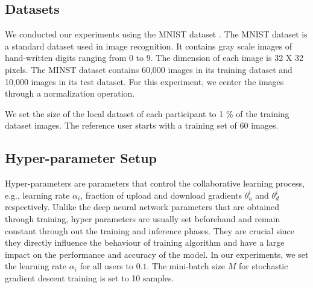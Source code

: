 \documentclass[conference]{IEEEtran}
\begin{document}




\subsection{Datasets}
We conducted our experiments using the MNIST dataset \cite{deng2012mnist}. The MNIST dataset is a standard dataset used in image
recognition. It contains gray scale images of hand-written digits ranging from 0 to 9. The dimension of each image is 32 X 32 pixels.
The MINST dataset contains 60,000 images in its training dataset and 10,000 images in its test dataset.
For this experiment, we center the images through a normalization operation.  

We set the size of the local dataset of each participant to 1 \% of the training dataset images.  The reference user starts with a
training set of 60 images.


\subsection{Hyper-parameter Setup}


Hyper-parameters are parameters that control the collaborative learning process, e.g., learning rate $\alpha_i$, fraction of upload and
download gradients $\theta^i_u$ and $\theta^i_d$ respectively. Unlike the deep neural network parameters that are obtained through
training, hyper parameters are usually set beforehand and remain constant through out the training and inference phases. They are
crucial since they directly influence the behaviour of training algorithm and have a large impact on the performance and accuracy of the
model. In our experiments, we set the learning rate $\alpha_i$ for all users to $0.1$.  The mini-batch size $M$ for stochastic gradient
descent training is set to 10 samples.
\end{document}
